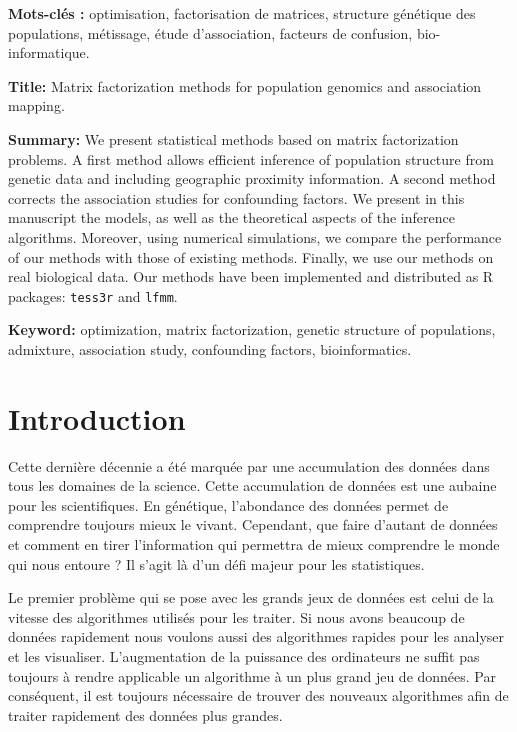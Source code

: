 \documentclass[12pt,a4paper,twoside]{ugathesis}
\begin{document}
\noindent \textbf{Mots-clés :} optimisation, factorisation de matrices, structure génétique des
populations, métissage, étude d'association, facteurs de confusion, bio-informatique.

\vspace{0.5cm}

\noindent \textbf{Title:} Matrix factorization methods for population genomics and association
mapping.

\noindent \textbf{Summary:} We present statistical methods based on matrix
factorization problems. A first method allows efficient inference of population
structure from genetic data and including geographic proximity information. A
second method corrects the association studies for confounding factors. We
present in this manuscript the models, as well as the theoretical aspects of the
inference algorithms. Moreover, using numerical simulations, we compare the
performance of our methods with those of existing methods. Finally, we use our
methods on real biological data. Our methods have been implemented and
distributed as R packages: \texttt{tess3r} and \texttt{lfmm}.

\noindent \textbf{Keyword:} optimization, matrix factorization, genetic structure of populations,
admixture, association study,  confounding factors, bioinformatics.
\mainmatter

\chapter{Introduction}
\label{sec:orga530ffd}
Cette dernière décennie a été marquée par une accumulation des données dans tous
les domaines de la science. Cette accumulation de données est une aubaine pour
les scientifiques. En génétique, l'abondance des données permet de comprendre
toujours mieux le vivant. Cependant, que faire d'autant de données et comment en
tirer l'information qui permettra de mieux comprendre le monde qui nous entoure
? Il s'agit là d'un défi majeur pour les statistiques.

Le premier problème qui se pose avec les grands jeux de données est celui de la
vitesse des algorithmes utilisés pour les traiter. Si nous avons beaucoup de
données rapidement nous voulons aussi des algorithmes rapides pour les analyser
et les visualiser. L'augmentation de la puissance des ordinateurs ne suffit pas
toujours à rendre applicable un algorithme à un plus grand jeu de données. Par
conséquent, il est toujours nécessaire de trouver des nouveaux algorithmes afin
de traiter rapidement des données plus grandes.
\end{document}
